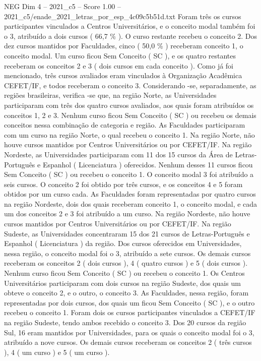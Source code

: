 \begin{textsample}{NEG Dim 4 – 2021\_c5 – Score 1.00 – 2021\_c5/enade\_2021\_letras\_por\_esp\_4c09c5b51d.txt}
Foram três os cursos participantes vinculados a Centros Universitários, e o conceito modal também foi o 3, atribuído a dois cursos ( 66,7 \% ).
O curso restante recebeu o conceito 2.
Dos dez cursos mantidos por Faculdades, cinco ( 50,0 \% ) receberam conceito 1, o conceito modal.
Um curso ficou Sem Conceito ( SC ), e os quatro restantes receberam os conceitos 2 e 3 ( dois cursos em cada conceito ).
Como já foi mencionado, três cursos avaliados eram vinculados à Organização Acadêmica CEFET/IF, e todos receberam o conceito 3.
Considerando -se, separadamente, as regiões brasileiras, verifica -se que, na região Norte, as Universidades participaram com três dos quatro cursos avaliados, aos quais foram atribuídos os conceitos 1, 2 e 3.
Nenhum curso ficou Sem Conceito ( SC ) ou recebeu os demais conceitos nessa combinação de categoria e região.
As Faculdades participaram com um curso na região Norte, o qual recebeu o conceito 1.
Na região Norte, não houve cursos mantidos por Centros Universitários ou por CEFET/IF.
Na região Nordeste, as Universidades participaram com 11 dos 15 cursos da Área de Letras-Português e Espanhol ( Licenciatura ) oferecidos.
Nenhum desses 11 cursos ficou Sem Conceito ( SC ) ou recebeu o conceito 1.
O conceito modal 3 foi atribuído a seis cursos.
O conceito 2 foi obtido por três cursos, e os conceitos 4 e 5 foram obtidos por um curso cada.
As Faculdades foram representadas por quatro cursos na região Nordeste, dois dos quais receberam conceito 1, o conceito modal, e cada um dos conceitos 2 e 3 foi atribuído a um curso.
Na região Nordeste, não houve cursos mantidos por Centros Universitários ou por CEFET/IF.
Na região Sudeste, as Universidades concentraram 15 dos 21 cursos de Letras-Português e Espanhol ( Licenciatura ) da região.
Dos cursos oferecidos em Universidades, nessa região, o conceito modal foi o 3, atribuído a sete cursos.
Os demais cursos receberam os conceitos 2 ( dois cursos ), 4 ( quatro cursos ) e 5 ( dois cursos ).
Nenhum curso ficou Sem Conceito ( SC ) ou recebeu o conceito 1.
Os Centros Universitários participaram com dois cursos na região Sudeste, dos quais um obteve o conceito 2, e o outro, o conceito 3.
As Faculdades, nessa região, foram representadas por dois cursos, dos quais um ficou Sem Conceito ( SC ), e o outro recebeu o conceito 1.
Foram dois os cursos participantes vinculados a CEFET/IF na região Sudeste, tendo ambos recebido o conceito 3.
Dos 20 cursos da região Sul, 16 eram mantidos por Universidades, para os quais o conceito modal foi o 3, atribuído a nove cursos.
Os demais cursos receberam os conceitos 2 ( três cursos ), 4 ( um curso ) e 5 ( um curso ).

\end{textsample}
